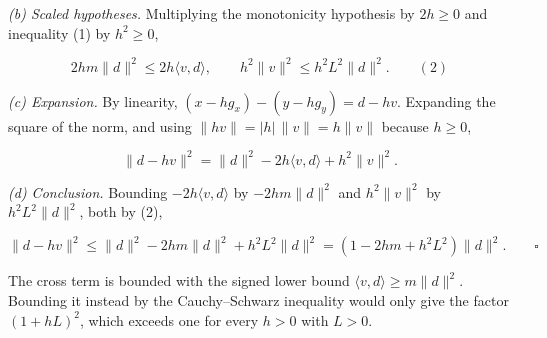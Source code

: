 \documentclass[11pt,a4paper]{article}
\begin{document}
\emph{(b) Scaled hypotheses.} Multiplying the monotonicity hypothesis by \(2h\ge0\) and inequality (1) by \(h^2\ge0\),


\[2hm\|d\|^2\le2h\langle v,d\rangle,\qquad h^2\|v\|^2\le h^2L^2\|d\|^2.\qquad(2)\]


\emph{(c) Expansion.} By linearity, \((x-hg_x)-(y-hg_y)=d-hv\). Expanding the square of the norm, and using \(\|hv\|=|h|\,\|v\|=h\|v\|\) because \(h\ge0\),


\[\|d-hv\|^2=\|d\|^2-2h\langle v,d\rangle+h^2\|v\|^2.\]


\emph{(d) Conclusion.} Bounding \(-2h\langle v,d\rangle\) by \(-2hm\|d\|^2\) and \(h^2\|v\|^2\) by \(h^2L^2\|d\|^2\), both by (2),


\[\|d-hv\|^2\le\|d\|^2-2hm\|d\|^2+h^2L^2\|d\|^2=(1-2hm+h^2L^2)\|d\|^2.\qquad\square\]


The cross term is bounded with the signed lower bound \(\langle v,d\rangle\ge m\|d\|^2\). Bounding it instead by the Cauchy–Schwarz inequality would only give the factor \((1+hL)^2\), which exceeds one for every \(h>0\) with \(L>0\).
\end{document}
